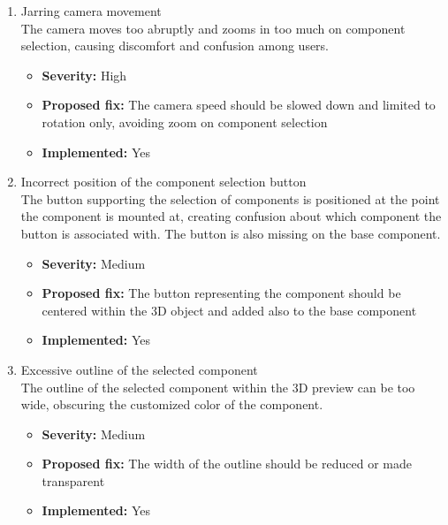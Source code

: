 \begin{enumerate}[label=\textbf{I\arabic*:}, leftmargin=*]
    \item Jarring camera movement
        \vspace{2pt}
        \\The camera moves too abruptly and zooms in too much on component selection, causing discomfort and confusion among users.
        \begin{itemize}[noitemsep, label=\trianglebullet]
            \item \textbf{Severity:} High
            \item \textbf{Proposed fix:} The camera speed should be slowed down and limited to rotation only, avoiding zoom on component selection
            \item \textbf{Implemented:} Yes
        \end{itemize}
        \vspace{4pt}

    \item Incorrect position of the component selection button
        \vspace{2pt}
        \\The button supporting the selection of components is positioned at the point the component is mounted at, creating confusion about which component the button is associated with. The button is also missing on the base component.
        \begin{itemize}[noitemsep, label=\trianglebullet]
            \item \textbf{Severity:} Medium
            \item \textbf{Proposed fix:} The button representing the component should be centered within the 3D object and added also to the base component
            \item \textbf{Implemented:} Yes
        \end{itemize}
        \vspace{4pt}

    \item Excessive outline of the selected component
        \vspace{2pt}
        \\The outline of the selected component within the 3D preview can be too wide, obscuring the customized color of the component.
        \begin{itemize}[noitemsep, label=\trianglebullet]
            \item \textbf{Severity:} Medium
            \item \textbf{Proposed fix:} The width of the outline should be reduced or made transparent
            \item \textbf{Implemented:} Yes
        \end{itemize}
        \vspace{4pt}


\end{enumerate}
